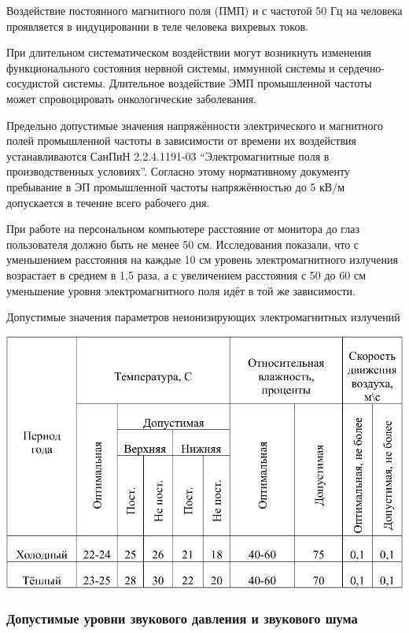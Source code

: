 Воздействие постоянного магнитного поля (ПМП) и с частотой 50 Гц на человека проявляется в индуцировании в теле человека вихревых токов.

При длительном систематическом воздействии могут возникнуть изменения функционального состояния нервной системы, иммунной системы и сердечно-сосудистой системы. Длительное воздействие ЭМП промышленной частоты может спровоцировать онкологические заболевания.

Предельно допустимые значения напряжённости электрического и магнитного полей промышленной частоты в зависимости от времени их воздействия устанавливаются СанПиН 2.2.4.1191-03 ``Электромагнитные поля в производственных условиях''\cite{OT12}. Согласно этому нормативному документу пребывание в ЭП промышленной частоты напряжённостью до 5 кВ/м допускается в течение всего рабочего дня.

При работе на персональном компьютере расстояние от монитора до глаз пользователя должно быть не менее 50 см. Исследования показали, что с уменьшением расстояния на каждые 10 см уровень электромагнитного излучения возрастает в среднем в 1,5 раза, а с увеличением расстояния с 50 до 60 см уменьшение уровня электромагнитного поля идёт в той же зависимости.

\begin{table}[!ht]
\caption{Допустимые значения параметров неионизирующих электромагнитных излучений}
\centering
\includegraphics[page=3, width=1\linewidth]{secure_table.pdf}
\label{tab:min_neoinige_elwave}
\end{table}
\subsubsection{Допустимые уровни звукового давления и звукового шума}

